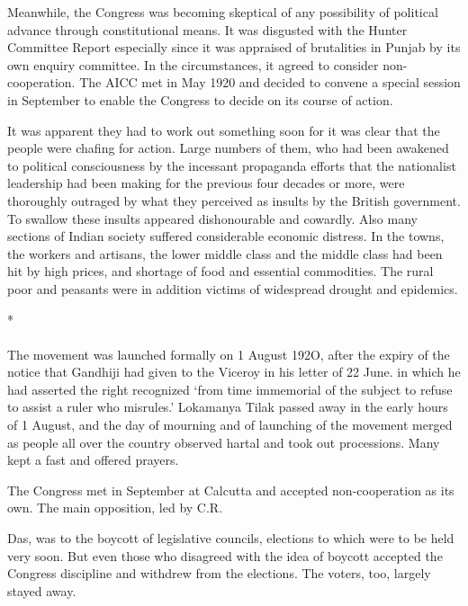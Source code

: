 \begin{multicols}{2}
Meanwhile, the Congress was becoming skeptical of any possibility of political advance through constitutional means. It was disgusted with the Hunter Committee Report especially since it was appraised of brutalities in Punjab by its own enquiry committee. In the circumstances, it agreed to consider non-cooperation. The AICC met in May 1920 and decided to convene a special session in September to enable the Congress to decide on its course of action. 

It was apparent they had to work out something soon for it was clear that the people were chafing for action. Large numbers of them, who had been awakened to political consciousness by the incessant propaganda efforts that the nationalist leadership had been making for the previous four decades or more, were thoroughly outraged by what they perceived as insults by the British government. To swallow these insults appeared dishonourable and cowardly. Also many sections of Indian society suffered considerable economic distress. In the towns, the workers and artisans, the lower middle class and the middle class had been hit by high prices, and shortage of food and essential commodities. The rural poor and peasants were in addition victims of widespread drought and epidemics.

\begin{center}*\end{center}

\paragraph*{}

The movement was launched formally on 1 August 192O, after the expiry of the notice that Gandhiji had given to the Viceroy in his letter of 22 June. in which he had asserted the right recognized `from time immemorial of the subject to refuse to assist a ruler who misrules.' Lokamanya Tilak passed away in the early hours of 1 August, and the day of mourning and of launching of the movement merged as people all over the country observed hartal and took out processions. Many kept a fast and offered prayers. 

The Congress met in September at Calcutta and accepted non-cooperation as its own. The main opposition, led by C.R. 

Das, was to the boycott of legislative councils, elections to which were to be held very soon. But even those who disagreed with the idea of boycott accepted the Congress discipline and withdrew from the elections. The voters, too, largely stayed away. 


\end{multicols}
